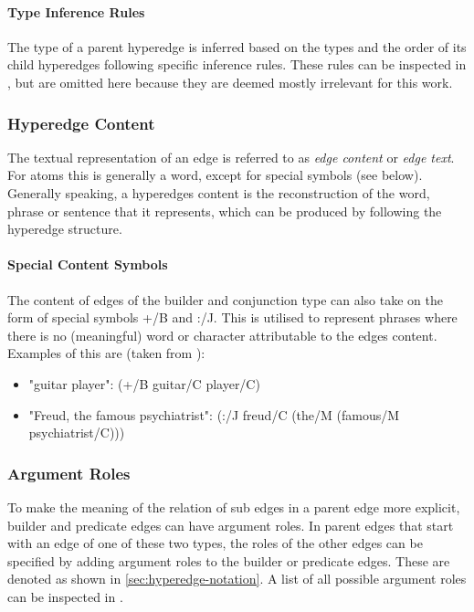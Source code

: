 \documentclass[11pt]{scrreprt}
\let\citef\cite  %
\let\cite\parencite  %
\begin{document}
\paragraph{Type Inference Rules}
The type of a parent hyperedge is inferred based on the types and the order of its child hyperedges following specific inference rules. These rules can be inspected in \citef[p. 8]{menezesSemanticHypergraphs2021}, but are omitted here because they are deemed mostly irrelevant for this work.


\subsubsection{Hyperedge Content}
The textual representation of an edge is referred to as \textit{edge content} or \textit{edge text}. For atoms this is generally a word, except for special symbols (see below). Generally speaking, a hyperedges content is the reconstruction of the word, phrase or sentence that it represents, which can be produced by following the hyperedge structure.

\paragraph{Special Content Symbols}
\label{sec:special-type-symbols}
The content of edges of the builder and conjunction type can also take on the form of special symbols \textsf{+/B} and \textsf{:/J}. This is utilised to represent phrases where there is no (meaningful) word or character attributable to the edges content. Examples of this are (taken from \citef[p. 7]{menezesSemanticHypergraphs2021}):

\begin{itemize}
	\item "guitar player": \textsf{(+/B guitar/C player/C)}
	\item "Freud, the famous psychiatrist": \textsf{(:/J freud/C (the/M (famous/M psychiatrist/C)))}
\end{itemize}


\subsubsection{Argument Roles}
To make the meaning of the relation of sub edges in a parent edge more explicit, builder and predicate edges can have argument roles. In parent edges that start with an edge of one of these two types, the roles of the other edges can be specified by adding argument roles to the builder or predicate edges. These are denoted as shown in \cref{sec:hyperedge-notation}. A list of all possible argument roles can be inspected in \cite[p. 8]{menezesSemanticHypergraphs2021}. 
\end{document}
